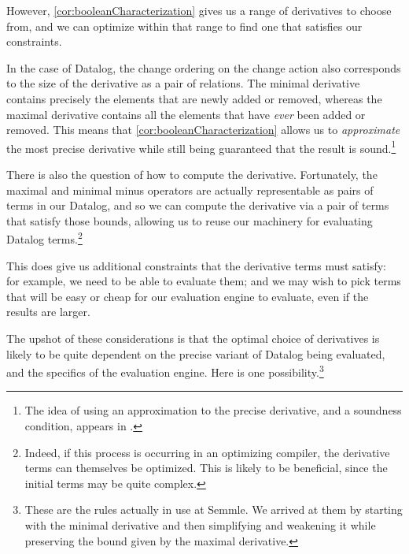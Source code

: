 However, \cref{cor:booleanCharacterization} gives us a range of derivatives to
choose from, and we can optimize within that range to find one that satisfies
our constraints.

In the case of Datalog, the change ordering on the change action also
corresponds to the size of the derivative as a pair of relations. The minimal
derivative contains precisely the elements that are newly added or removed,
whereas the maximal derivative contains all the elements that have \emph{ever}
been added or removed. This means that \cref{cor:booleanCharacterization} allows
us to \emph{approximate} the most precise derivative while still being
guaranteed that the result is sound.\footnote{The idea of using an approximation
to the precise derivative, and a soundness condition, appears in \textcite{bancilhon1986amateur}.}

There is also the question of how to compute the derivative. Fortunately, the
maximal and minimal minus operators are actually representable as pairs of terms
in our Datalog, and so we can compute the derivative via a pair of terms that
satisfy those bounds, allowing us to reuse our machinery for evaluating Datalog
terms.\footnote{Indeed, if this process is occurring in an optimizing compiler,
  the derivative terms can themselves be optimized. This is likely to be
  beneficial, since the initial terms may be quite complex.}

This does give us additional constraints that the derivative terms must satisfy:
for example, we need to be able to evaluate them; and we may wish to pick terms that will be easy or cheap
for our evaluation engine to evaluate, even if the results are larger.

The upshot of these considerations is that the optimal choice of derivatives is likely
to be quite dependent on the precise variant of Datalog being evaluated, and the
specifics of the evaluation engine. Here is one possibility.\footnote{These are
  the rules actually in use at Semmle. We arrived at them by starting with the
  minimal derivative and then simplifying and weakening it while preserving the
  bound given by the maximal derivative.}

